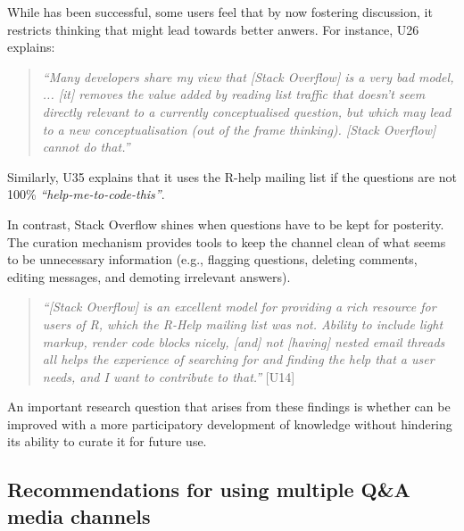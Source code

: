 While \SO  has been successful, some users feel that by now fostering discussion, it restricts thinking that might lead towards better anwers. 
For instance, U26 explains:
    \begin{quote}
        \textit{``Many developers share my view that [Stack Overflow] is a very bad model, ... [it] removes the value added by reading list traffic that doesn't seem directly relevant to a currently conceptualised question, but which may lead to a new conceptualisation (out of the frame thinking). [Stack Overflow] cannot do that.''}
    \end{quote}
    Similarly, U35 explains that it uses the R-help mailing list if the questions are not 100\% \textit{``help-me-to-code-this''}.

    In contrast, Stack Overflow shines when questions have to be kept for posterity. 
    The curation mechanism provides tools to keep the channel clean of what seems to be unnecessary information (e.g., flagging questions, deleting comments, editing messages, and demoting irrelevant answers).

    \begin{quote}
        \textit{``[Stack Overflow] is an excellent model for providing a rich resource for users of R, which the R-Help mailing list was not. 
        Ability to include light markup, render code blocks nicely, [and] not [having] nested email threads all helps the experience of searching for and finding the help that a user needs, and I want to contribute to that.''} [U14]
    \end{quote}


An important research question that arises from these findings is whether \SO can be improved with a more participatory development of knowledge without
hindering its ability to curate it for future use.


\subsection{Recommendations for using multiple Q\&A media channels}

